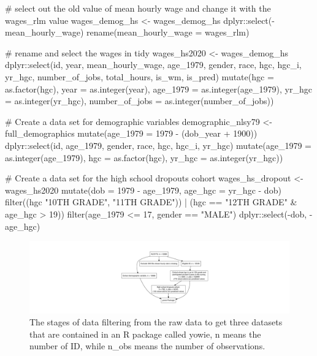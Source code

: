 \begin{Schunk}
\begin{Sinput}
# select out the old value of mean hourly wage and change it with the wages_rlm value
wages_demog_hs <- wages_demog_hs %
  dplyr::select(-mean_hourly_wage) %
  rename(mean_hourly_wage = wages_rlm)

# rename and select the wages in tidy
wages_hs2020 <- wages_demog_hs %
  dplyr::select(id, year, mean_hourly_wage, age_1979, gender, race, hgc, hgc_i, yr_hgc,
                number_of_jobs, total_hours, is_wm, is_pred) %
  mutate(hgc = as.factor(hgc),
         year = as.integer(year),
         age_1979 = as.integer(age_1979),
         yr_hgc = as.integer(yr_hgc),
         number_of_jobs = as.integer(number_of_jobs))

# Create a data set for demographic variables
demographic_nlsy79 <- full_demographics %
  mutate(age_1979 = 1979 - (dob_year + 1900)) %
  dplyr::select(id,
         age_1979,
         gender,
         race,
         hgc,
         hgc_i,
         yr_hgc) %
  mutate(age_1979 = as.integer(age_1979),
         hgc = as.factor(hgc),
         yr_hgc = as.integer(yr_hgc))

# Create a data set for the high school dropouts cohort
wages_hs_dropout <- wages_hs2020 %
  mutate(dob = 1979 - age_1979,
         age_hgc = yr_hgc - dob) %
  filter((hgc %
                     "10TH GRADE",
                     "11TH GRADE")) |
          (hgc == "12TH GRADE" &
              age_hgc > 19)) %
  filter(age_1979 <= 17,
         gender == "MALE") %
  dplyr::select(-dob,
         -age_hgc)
\end{Sinput}
\end{Schunk}

\begin{Schunk}
\begin{figure}
\includegraphics{figures/flowchart-1} \caption[The stages of data filtering from the raw data to get three datasets that are contained in an R package called yowie, n means the number of ID, while n_obs means the number of observations]{The stages of data filtering from the raw data to get three datasets that are contained in an R package called yowie, n means the number of ID, while n_obs means the number of observations.}\label{fig:flowchart}
\end{figure}
\end{Schunk}

